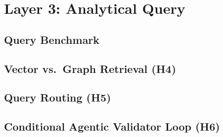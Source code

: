 \chapter{Layer 3: Analytical Query}
\label{ch:query}


\section{Query Benchmark}
\label{sec:q-benchmark}

\section{Vector vs.\ Graph Retrieval (H4)}
\label{sec:q-graph-vs-vector}

\section{Query Routing (H5)}
\label{sec:q-routing}

\section{Conditional Agentic Validator Loop (H6)}
\label{sec:q-agentic}
